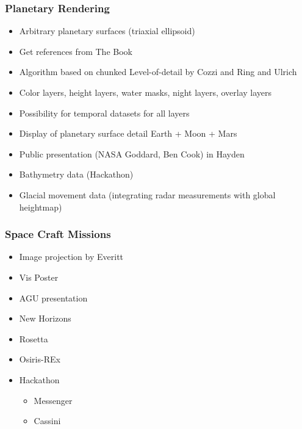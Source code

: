 \subsubsection{Planetary Rendering} \label{contributions:astro:openspace:globebrowsing}
\begin{itemize}
    \item Arbitrary planetary surfaces (triaxial ellipsoid)
    \item Get references from The Book
    \item Algorithm based on chunked Level-of-detail by Cozzi and Ring \cite{cozzi20113d} and Ulrich \cite{ulrich2002rendering}
    \item Color layers, height layers, water masks, night layers, overlay layers
    \item Possibility for temporal datasets for all layers
    \item Display of planetary surface detail Earth + Moon + Mars
    \item Public presentation (NASA Goddard, Ben Cook) in Hayden
    \item Bathymetry data (Hackathon)
    \item Glacial movement data (integrating radar measurements with global heightmap)
\end{itemize}

\subsubsection{Space Craft Missions} \label{contributions:astro:openspace:spacecraft}
\begin{itemize}
    \item Image projection by Everitt \cite{everitt2001hardware}
    \item Vis Poster\cite{bock15openspace}
    \item AGU presentation \cite{bock15bopenspace}
    \item New Horizons
    \item Rosetta
    \item Osiris-REx
    \item Hackathon
    \begin{itemize}
        \item Messenger
        \item Cassini
    \end{itemize}
\end{itemize}
